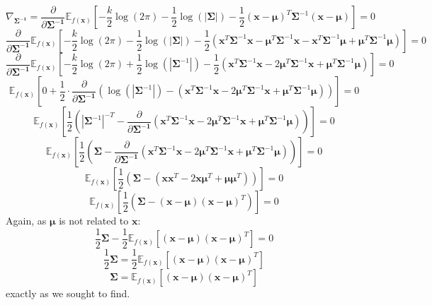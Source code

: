 \documentclass{article}
\begin{document}
{\[
  \nabla_{\boldsymbol{\Sigma^{-1}}} = \frac{\partial}{\partial \boldsymbol{\Sigma^{-1}}} \mathbb{E}_{f(\mathbf{x})} [-\frac{k}{2} \log(2\pi) - \frac{1}{2} \log(|\boldsymbol{\Sigma}|) - \frac{1}{2}(\mathbf{x} - \boldsymbol{\mu})^T \boldsymbol{\Sigma}^{-1} (\mathbf{x} - \boldsymbol{\mu})] = 0
\]
\[
  \frac{\partial}{\partial \boldsymbol{\Sigma^{-1}}} \mathbb{E}_{f(\mathbf{x})} [-\frac{k}{2} \log(2\pi) - \frac{1}{2} \log(|\boldsymbol{\Sigma}|) - \frac{1}{2}(\mathbf{x}^T \boldsymbol{\Sigma}^{-1} \mathbf{x} - \boldsymbol{\mu}^T \boldsymbol{\Sigma}^{-1} \mathbf{x} - \mathbf{x}^T \boldsymbol{\Sigma}^{-1} \boldsymbol{\mu} + \boldsymbol{\mu}^T \boldsymbol{\Sigma}^{-1} \boldsymbol{\mu})] = 0
\]
\[
  \frac{\partial}{\partial \boldsymbol{\Sigma^{-1}}} \mathbb{E}_{f(\mathbf{x})} [-\frac{k}{2} \log(2\pi) + \frac{1}{2} \log(|\boldsymbol{\Sigma}^{-1}|) - \frac{1}{2}(\mathbf{x}^T \boldsymbol{\Sigma}^{-1} \mathbf{x} - 2 \boldsymbol{\mu}^T \boldsymbol{\Sigma}^{-1} \mathbf{x} + \boldsymbol{\mu}^T \boldsymbol{\Sigma}^{-1} \boldsymbol{\mu})] = 0
\]
\[
  \mathbb{E}_{f(\mathbf{x})} [0 + \frac{1}{2} \cdot \frac{\partial}{\partial \boldsymbol{\Sigma^{-1}}} ( \log(|\boldsymbol{\Sigma}^{-1}|) - (\mathbf{x}^T \boldsymbol{\Sigma}^{-1} \mathbf{x} - 2 \boldsymbol{\mu}^T \boldsymbol{\Sigma}^{-1} \mathbf{x} + \boldsymbol{\mu}^T \boldsymbol{\Sigma}^{-1} \boldsymbol{\mu}))] = 0
\]
\[
  \mathbb{E}_{f(\mathbf{x})} [\frac{1}{2}  ( |\boldsymbol{\Sigma}^{-1}|^{-T} - \frac{\partial}{\partial \boldsymbol{\Sigma^{-1}}} (\mathbf{x}^T \boldsymbol{\Sigma}^{-1} \mathbf{x} - 2 \boldsymbol{\mu}^T \boldsymbol{\Sigma}^{-1} \mathbf{x} + \boldsymbol{\mu}^T \boldsymbol{\Sigma}^{-1} \boldsymbol{\mu}))] = 0
\]
\[
  \mathbb{E}_{f(\mathbf{x})} [\frac{1}{2} (\boldsymbol{\Sigma} - \frac{\partial}{\partial \boldsymbol{\Sigma^{-1}}} (\mathbf{x}^T \boldsymbol{\Sigma}^{-1} \mathbf{x} - 2 \boldsymbol{\mu}^T \boldsymbol{\Sigma}^{-1} \mathbf{x} + \boldsymbol{\mu}^T \boldsymbol{\Sigma}^{-1} \boldsymbol{\mu}))] = 0
\]
\[
  \mathbb{E}_{f(\mathbf{x})} [\frac{1}{2} (\boldsymbol{\Sigma} - (\mathbf{x} \mathbf{x}^T - 2 \mathbf{x} \boldsymbol{\mu}^T + \boldsymbol{\mu} \boldsymbol{\mu}^T ))] = 0
\]
\[
  \mathbb{E}_{f(\mathbf{x})} [\frac{1}{2} (\boldsymbol{\Sigma} - (\mathbf{x} - \boldsymbol{\mu})(\mathbf{x} - \boldsymbol{\mu})^T)] = 0
\]
Again, as \(\boldsymbol{\mu}\) is not related to \(\mathbf{x}\):
\[
  \frac{1}{2} \boldsymbol{\Sigma} - \frac{1}{2} \mathbb{E}_{f(\mathbf{x})} [(\mathbf{x} - \boldsymbol{\mu})(\mathbf{x} - \boldsymbol{\mu})^T ] = 0
\]
\[
  \frac{1}{2} \boldsymbol{\Sigma} = \frac{1}{2} \mathbb{E}_{f(\mathbf{x})} [(\mathbf{x} - \boldsymbol{\mu})(\mathbf{x} - \boldsymbol{\mu})^T ]
\]
\[
  \boxed{\boldsymbol{\Sigma} = \mathbb{E}_{f(\mathbf{x})} [(\mathbf{x} - \boldsymbol{\mu})(\mathbf{x} - \boldsymbol{\mu})^T]}
\]
exactly as we sought to find. 

}
\end{document}
